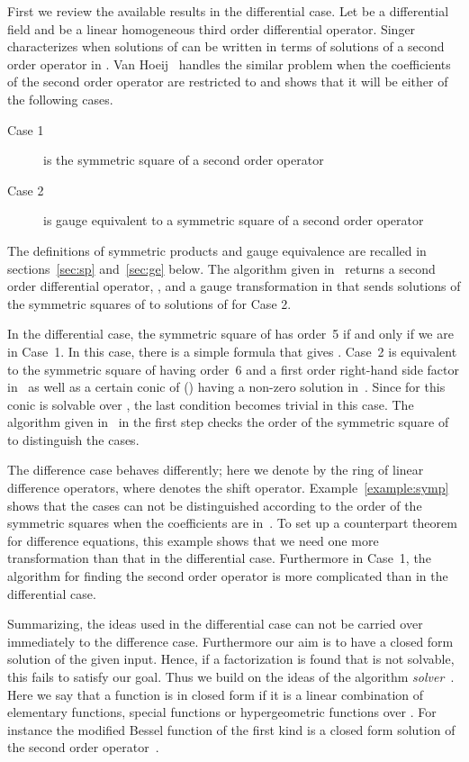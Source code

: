 \documentclass{article}
\begin{document}
First we review the available results in the differential case.  Let  be a differential
field and  be a linear homogeneous third order
differential operator.  Singer~\cite{MS85} characterizes when solutions of  can be
written in terms of solutions of a second order operator in .  Van
Hoeij~\cite{vH07} handles the similar problem when the coefficients of the second order
operator are restricted to  and shows that it will be either of the following cases.
\begin{description}
\item[Case 1]  is the symmetric square of a second order operator 
\item[Case 2]  is gauge equivalent to a symmetric square of a second order operator
  
\end{description} 
The definitions of symmetric products and gauge equivalence are recalled in sections~\ref{sec:sp}
and~\ref{sec:ge} below.  The algorithm given in~\cite{vH07} returns a second order differential
operator, , and a gauge transformation in  that sends
solutions of the symmetric squares of  to solutions of  for Case 2.

In the differential case, the symmetric square of  has order~5 if and only if we are
in Case~1. In this case, there is a simple formula that gives .  Case~2 is equivalent to the
symmetric square of  having order~6 and a first order right-hand side factor
in~ as well as a certain conic of (\cite[Equation 4.2.1]{MS85}) having a
non-zero solution in~.  Since for  this conic is solvable over , the
last condition becomes trivial in this case.  The algorithm given in~\cite{vH07} in the
first step checks the order of the symmetric square of  to distinguish the cases.


The difference case behaves differently; here we denote by  the ring of
linear difference operators, where  denotes the shift operator.
Example~\ref{example:symp} shows that the cases can not be distinguished according to the
order of the symmetric squares when the coefficients are in~. 
To set up a counterpart theorem for difference equations, 
this example shows that we need one more transformation than that in the differential case. 
Furthermore in Case~1, the algorithm for
finding the second order operator is more complicated than in the differential case.




Summarizing, the ideas used in the differential case can not be carried over immediately to
the difference case. Furthermore our aim is to have a closed form solution of the given
input. Hence, if a factorization is found that is not solvable, this fails to satisfy our
goal. Thus we build on the ideas of the algorithm {\em solver}~\cite{YC11,CH09,CHG10}.
Here we say that a function is in closed form if it is a linear combination of elementary
functions, special functions or hypergeometric functions over .  For instance the
modified Bessel function of the first kind is a closed form solution of the second order
operator~.
\end{document}
